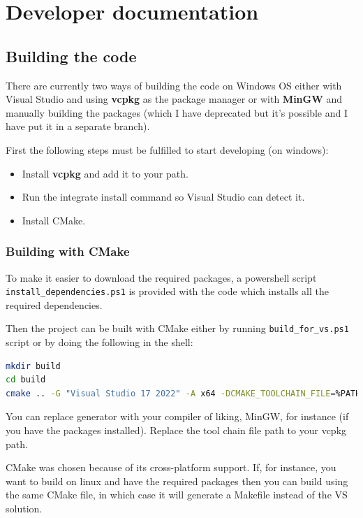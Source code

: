 \chapter{Developer documentation}
\label{ch:impl}

\section{Building the code}
\label{sec:building_code}

There are currently two ways of building the code on Windows OS either with Visual Studio and using \textbf{vcpkg} as the package manager or with \textbf{MinGW} and manually building the packages (which I have deprecated but it's possible and I have put it in a separate branch).

First the following steps must be fulfilled to start developing (on windows):

\begin{itemize}
	\item Install \textbf{vcpkg} and add it to your path.
	\item Run the integrate install command so Visual Studio can detect it.
	\item Install CMake.
\end{itemize}

\subsection{Building with CMake}

To make it easier to download the required packages, a powershell script \texttt{install\_dependencies.ps1} is provided with the code which installs all the required dependencies.

Then the project can be built with CMake either by running \texttt{build\_for\_vs.ps1} script or by doing the following in the shell:
\begin{lstlisting}[language=bash]
mkdir build
cd build
cmake .. -G "Visual Studio 17 2022" -A x64 -DCMAKE_TOOLCHAIN_FILE=%PATH_TO_VCPKG%/scripts/buildsystems/vcpkg.cmake
\end{lstlisting}

You can replace generator with your compiler of liking, MinGW, for instance (if you have the packages installed). Replace the tool chain file path to your vcpkg path. 

CMake was chosen because of its cross-platform support. If, for instance, you want to build on linux and have the required packages then you can build using the same CMake file, in which case it will generate a Makefile instead of the VS solution.

